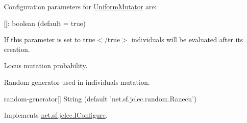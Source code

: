 Configuration parameters for \hyperlink{classnet_1_1sf_1_1jclec_1_1intarray_1_1mut_1_1_uniform_mutator}{Uniform\-Mutator} are\-:


\begin{DoxyItemize}
\item {\ttfamily \mbox{[}\mbox{]}\-: boolean (default = true)}

If this parameter is set to {\ttfamily true$<$/true$>$ individuals will be evaluated after its creation.  }
\item {}

{\ttfamily  Locus mutation probability.  }
\item {}

{\ttfamily  Random generator used in individuals mutation. 
\begin{DoxyItemize}
\item {\ttfamily random-\/generator\mbox{[}\mbox{]} String (default 'net.\-sf.\-jclec.\-random.\-Ranecu')}  
\end{DoxyItemize}}
\end{DoxyItemize}

Implements \hyperlink{interfacenet_1_1sf_1_1jclec_1_1_i_configure_add31a65a04d148c690a956fbbad6987c}{net.\-sf.\-jclec.\-I\-Configure}.

